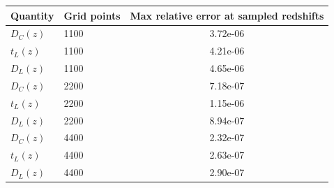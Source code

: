 \begin{tabular}{llc}
\toprule
Quantity & Grid points & Max relative error at sampled redshifts \\
\midrule
$D_C(z)$ & 1100 & 3.72e-06 \\
$t_L(z)$ & 1100 & 4.21e-06 \\
$D_L(z)$ & 1100 & 4.65e-06 \\
$D_C(z)$ & 2200 & 7.18e-07 \\
$t_L(z)$ & 2200 & 1.15e-06 \\
$D_L(z)$ & 2200 & 8.94e-07 \\
$D_C(z)$ & 4400 & 2.32e-07 \\
$t_L(z)$ & 4400 & 2.63e-07 \\
$D_L(z)$ & 4400 & 2.90e-07 \\
\bottomrule
\end{tabular}